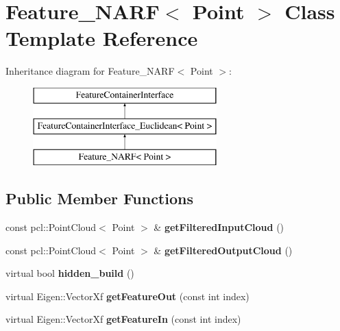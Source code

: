 \hypertarget{classFeature__NARF}{
\section{Feature\_\-NARF$<$ Point $>$ Class Template Reference}
\label{classFeature__NARF}
}
Inheritance diagram for Feature\_\-NARF$<$ Point $>$:\begin{figure}[H]
\begin{center}
\leavevmode
\includegraphics[height=3.000000cm]{classFeature__NARF}
\end{center}
\end{figure}
\subsection*{Public Member Functions}
\begin{DoxyCompactItemize}
\item 
\hypertarget{classFeature__NARF_a70a1a31f0623568e2751159f4655b190}{
const pcl::PointCloud$<$ Point $>$ \& {\bfseries getFilteredInputCloud} ()}
\label{classFeature__NARF_a70a1a31f0623568e2751159f4655b190}

\item 
\hypertarget{classFeature__NARF_ae365ea35195807c992b3876e595247e9}{
const pcl::PointCloud$<$ Point $>$ \& {\bfseries getFilteredOutputCloud} ()}
\label{classFeature__NARF_ae365ea35195807c992b3876e595247e9}

\item 
\hypertarget{classFeature__NARF_ab631be8e4846d2ffd28f957bf645a1a8}{
virtual bool {\bfseries hidden\_\-build} ()}
\label{classFeature__NARF_ab631be8e4846d2ffd28f957bf645a1a8}

\item 
\hypertarget{classFeature__NARF_a61722353ce82ffc97bf05229b08f3bca}{
virtual Eigen::VectorXf {\bfseries getFeatureOut} (const int index)}
\label{classFeature__NARF_a61722353ce82ffc97bf05229b08f3bca}

\item 
\hypertarget{classFeature__NARF_a1aef426f7ba2a31f2011f7d960c9da7b}{
virtual Eigen::VectorXf {\bfseries getFeatureIn} (const int index)}
\label{classFeature__NARF_a1aef426f7ba2a31f2011f7d960c9da7b}

\end{DoxyCompactItemize}
